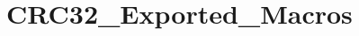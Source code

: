 \hypertarget{group___c_r_c32___exported___macros}{}\section{C\+R\+C32\+\_\+\+Exported\+\_\+\+Macros}
\label{group___c_r_c32___exported___macros}
